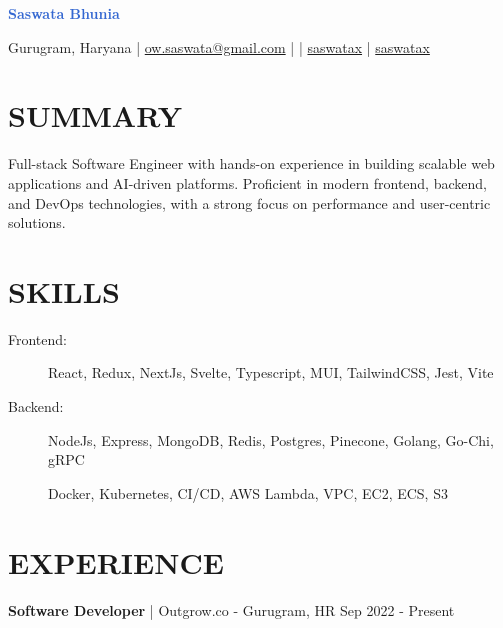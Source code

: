\documentclass[]{resume}
\begin{document}
\textrm{\Huge\textcolor{highlight}{\textbf{Saswata Bhunia}}}
\vspace{.4em}

Gurugram, Haryana | \href{mailto:ow.saswata@gmail.com}{\faEnvelope \space ow.saswata@gmail.com} | \faPhone {} | \href{https://www.linkedin.com/in/saswatax}{\faLinkedin \space saswatax} | \href{https://github.com/saswatax}{\faGithub \space saswatax}
\vspace{.4em}

\section{SUMMARY}
Full-stack Software Engineer with hands-on experience in building scalable web applications and AI-driven platforms. Proficient in modern frontend, backend, and DevOps technologies, with a strong focus on performance and user-centric solutions.

\section{SKILLS}
\begin{description}
  \item[Frontend:] React, Redux, NextJs, Svelte, Typescript, MUI, TailwindCSS, Jest, Vite
  \item[Backend:] NodeJs, Express, MongoDB, Redis, Postgres, Pinecone, Golang, Go-Chi, gRPC
  \item[] Docker, Kubernetes, CI/CD, AWS Lambda, VPC, EC2, ECS, S3
\end{description}

\section{EXPERIENCE}
\textbf{Software Developer} | Outgrow.co - Gurugram, HR \hfill Sep 2022 - Present
\end{document}

